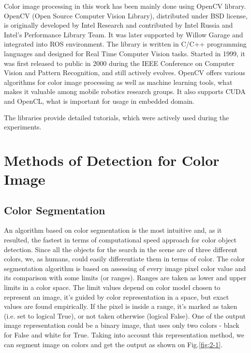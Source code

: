\documentclass{ctuthesis}
\begin{document}
Color image processing in this work has been mainly done using OpenCV library. OpenCV (Open Source Computer Vision Library), distributed under BSD license, is originally developed by Intel Research and contributed by Intel Russia and Intel's Performance Library Team. It was later supported by Willow Garage and integrated into ROS environment. The library is written in C/C++ programming languages and designed for Real Time Computer Vision tasks. Started in 1999, it was first released to public in 2000 during the IEEE Conference on Computer Vision and Pattern Recognition, and still actively evolves. OpenCV offers various algorithms for color image processing as well as machine learning tools, what makes it valuable among mobile robotics research groups. It also supports CUDA and OpenCL, what is important for usage in embedded domain.

The libraries provide detailed tutorials, which were actively used during the experiments.



\chapter{Methods of Detection for Color Image}
\section{Color Segmentation}

An algorithm based on color segmentation is the most intuitive and, as it resulted, the fastest in terms of computational speed approach for color object detection. Since all the objects for the search in the scene are of three different colors, we, as humans, could easily differentiate them in terms of color. The color segmentation algorithm is based on assessing of every image pixel color value and its comparison with some limits (or ranges). Ranges are taken as lower and upper limits in a color space. The limit values depend on color model chosen to represent an image, it's guided by color representation in a space, but exact values are found empirically. If the pixel is inside a range, it's marked as taken (i.e. set to logical True), or not taken otherwise (logical False). One of the output image representation could be a binary image, that uses only two colors - black for False and white for True. Taking into account this representation method, we can segment image on colors and get the output as shown on Fig.\ref{fig:2-1}.
\end{document}
